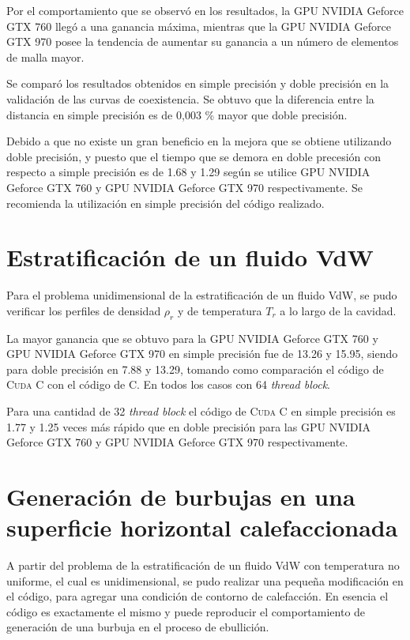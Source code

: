 Por el comportamiento que se observó en los resultados, la GPU NVIDIA Geforce GTX 760 llegó a una ganancia máxima, mientras que la GPU NVIDIA Geforce GTX 970 posee la tendencia de aumentar su ganancia a un número de elementos de malla mayor.

Se comparó los resultados obtenidos en simple precisión y doble precisión en la validación de las curvas de coexistencia. Se obtuvo que la diferencia entre la distancia en simple precisión es de 0,003 \% mayor que doble precisión.

Debido a que no existe un gran beneficio en la mejora que se obtiene utilizando doble precisión, y puesto que el tiempo que se demora en doble precesión con respecto a simple precisión es de 1.68 y 1.29 según se utilice GPU NVIDIA Geforce GTX 760 y GPU NVIDIA Geforce GTX 970 respectivamente. Se recomienda la utilización en simple precisión del código realizado.

\section{Estratificación de un fluido VdW}

Para el problema unidimensional de la estratificación de un fluido VdW, se pudo verificar los perfiles de densidad $\rho_r$ y de temperatura $T_r$ a lo largo de la cavidad. 

La mayor ganancia que se obtuvo para la GPU NVIDIA Geforce GTX 760 y GPU NVIDIA Geforce GTX 970 en simple precisión fue de 13.26 y 15.95, siendo para doble precisión en 7.88 y 13.29, tomando como comparación el código de \textsc{Cuda C} con el código de \textsc{C}. En todos los casos con 64 \textit{thread block}.

Para una cantidad de 32 \textit{thread block} el código de \textsc{Cuda C}  en simple precisión es 1.77 y 1.25 veces más rápido que en doble precisión para  las GPU NVIDIA Geforce GTX 760 y GPU NVIDIA Geforce GTX 970 respectivamente. 

\section{Generación de burbujas en una superficie horizontal calefaccionada}

A partir del problema de la estratificación de un fluido VdW con temperatura no uniforme, el cual es unidimensional, se pudo realizar una pequeña modificación en el código, para agregar una condición de contorno de calefacción. En esencia el código es exactamente el mismo y puede reproducir el comportamiento de generación de una burbuja en el proceso de ebullición. 

